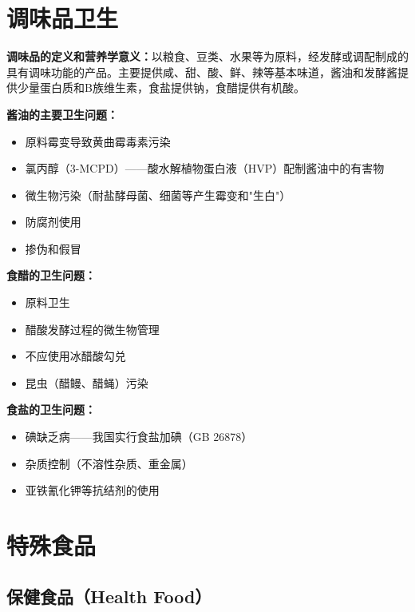 \section{调味品卫生}

\begin{tipbox}
\textbf{调味品的定义和营养学意义：}以粮食、豆类、水果等为原料，经发酵或调配制成的具有调味功能的产品。主要提供咸、甜、酸、鲜、辣等基本味道，酱油和发酵酱提供少量蛋白质和B族维生素，食盐提供钠，食醋提供有机酸。

\textbf{酱油的主要卫生问题：}
\begin{itemize}[leftmargin=*]
    \item 原料霉变导致黄曲霉毒素污染
    \item 氯丙醇（3-MCPD）——酸水解植物蛋白液（HVP）配制酱油中的有害物
    \item 微生物污染（耐盐酵母菌、细菌等产生霉变和"生白"）
    \item 防腐剂使用
    \item 掺伪和假冒
\end{itemize}

\textbf{食醋的卫生问题：}
\begin{itemize}[leftmargin=*]
    \item 原料卫生
    \item 醋酸发酵过程的微生物管理
    \item 不应使用冰醋酸勾兑
    \item 昆虫（醋鳗、醋蝇）污染
\end{itemize}

\textbf{食盐的卫生问题：}
\begin{itemize}[leftmargin=*]
    \item 碘缺乏病——我国实行食盐加碘（GB 26878）
    \item 杂质控制（不溶性杂质、重金属）
    \item 亚铁氰化钾等抗结剂的使用
\end{itemize}
\end{tipbox}

\section{特殊食品}

\subsection{保健食品（Health Food）}

